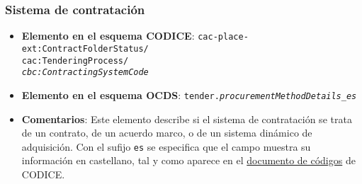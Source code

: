         \subsubsection{Sistema de contratación} \label{subsec:SistemaDeContratacion}
            \begin{itemize}
                \item \textbf{Elemento en el esquema CODICE}:
                    \tabto{7.6cm} \texttt{cac-place-ext:ContractFolderStatus/} \\
                    \tabto{7.6cm} \texttt{cac:TenderingProcess/} \\
                    \tabto{7.6cm} \texttt{\textit{cbc:ContractingSystemCode}}
                \item \textbf{Elemento en el esquema OCDS}:
                    \tabto{7.6cm} \texttt{tender.\textit{procurementMethodDetails\_es}}
                \item \textbf{Comentarios}: Este elemento describe si el sistema de contratación se trata de un contrato, de un acuerdo marco, o de un sistema dinámico de adquisición. Con el sufijo \texttt{es} se especifica que el campo muestra su información en castellano, tal y como aparece en el \href{https://contrataciondelestado.es/codice/cl/2.08/ContractingSystemTypeCode-2.08.gc}{documento de códigos} de CODICE.
            \end{itemize}
        

